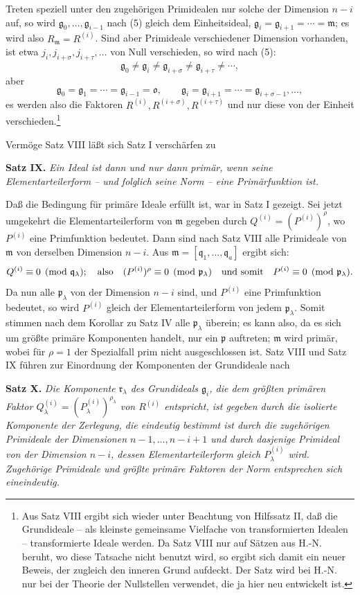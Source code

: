 \documentclass[11pt]{article}
\providecommand{\frakm}{\mathfrak m}
\providecommand{\frakp}{\mathfrak p}
\providecommand{\frakq}{\mathfrak q}
\providecommand{\frakr}{\mathfrak r}
\providecommand{\frakg}{\mathfrak g}
\providecommand{\frako}{\mathfrak o}
\begin{document}
Treten speziell unter den zugehörigen Primidealen nur solche der Dimension $n-i$ auf, so wird $\frakg_0,\ldots,\frakg_{i-1}$ nach (5) gleich dem Einheitsideal, $\frakg_i=\frakg_{i+1}=\cdots=\frakm$; es wird also $R_\frakm=R^{(i)}$. Sind aber Primideale verschiedener Dimension vorhanden, ist etwa $j_i,j_{i+\sigma},j_{i+\tau},\ldots$ von Null verschieden, so wird nach (5):
\[
 \frakg_0\ne\frakg_i\ne\frakg_{i+\sigma}\ne\frakg_{i+\tau}\ne\cdots,
\]
aber
\[
 \frakg_0=\frakg_1=\cdots=\frakg_{i-1}=\frako,
 \qquad
 \frakg_i=\frakg_{i+1}=\cdots=\frakg_{i+\sigma-1},\ldots,
\]
es werden also die Faktoren $R^{(i)},R^{(i+\sigma)},R^{(i+\tau)}$ und nur diese von der Einheit verschieden.\footnote{Aus Satz VIII ergibt sich wieder unter Beachtung von Hilfssatz II, daß die Grundideale -- als kleinste gemeinsame Vielfache von transformierten Idealen -- transformierte Ideale werden. Da Satz VIII nur auf Sätzen aus H.-N. beruht, wo diese Tatsache nicht benutzt wird, so ergibt sich damit ein neuer Beweis, der zugleich den inneren Grund aufdeckt. Der Satz wird bei H.-N. nur bei der Theorie der Nullstellen verwendet, die ja hier neu entwickelt ist.}

Vermöge Satz VIII läßt sich Satz I verschärfen zu

\textbf{Satz IX.} \emph{Ein Ideal ist dann und nur dann primär, wenn seine Elementarteilerform -- und folglich seine Norm -- eine Primärfunktion ist.}

Daß die Bedingung für primäre Ideale erfüllt ist, war in Satz I gezeigt. Sei jetzt umgekehrt die Elementarteilerform von $\frakm$ gegeben durch $Q^{(i)}=(P^{(i)})^\rho$, wo $P^{(i)}$ eine Primfunktion bedeutet. Dann sind nach Satz VIII alle Primideale von $\frakm$ von derselben Dimension $n-i$. Aus $\frakm=[\frakq_1,\ldots,\frakq_a]$ ergibt sich:
\[
 Q^{(i)}\equiv0\pmod{\frakq_\lambda};\quad\hbox{also}\quad
 (P^{(i)})^\rho\equiv0\pmod{\frakp_\lambda}\quad\hbox{und somit}\quad
 P^{(i)}\equiv0\pmod{\frakp_\lambda}.
\]
Da nun alle $\frakp_\lambda$ von der Dimension $n-i$ sind, und $P^{(i)}$ eine Primfunktion bedeutet, so wird $P^{(i)}$ gleich der Elementarteilerform von jedem $\frakp_\lambda$. Somit stimmen nach dem Korollar zu Satz IV alle $\frakp_\lambda$ überein; es kann also, da es sich um größte primäre Komponenten handelt, nur ein $\frakp$ auftreten; $\frakm$ wird primär, wobei für $\rho=1$ der Spezialfall prim nicht ausgeschlossen ist. Satz VIII und Satz IX führen zur Einordnung der Komponenten der Grundideale nach

\textbf{Satz X.} \emph{Die Komponente $\frakr_\lambda$ des Grundideals $\frakg_i$, die dem größten primären Faktor $Q_\lambda^{(i)}=(P_\lambda^{(i)})^{\rho_\lambda}$ von $R^{(i)}$ entspricht, ist gegeben durch die isolierte Komponente der Zerlegung, die eindeutig bestimmt ist durch die zugehörigen Primideale der Dimensionen $n-1,\ldots,n-i+1$ und durch dasjenige Primideal von der Dimension $n-i$, dessen Elementarteilerform gleich $P_\lambda^{(i)}$ wird. Zugehörige Primideale und größte primäre Faktoren der Norm entsprechen sich eineindeutig.}
\end{document}
